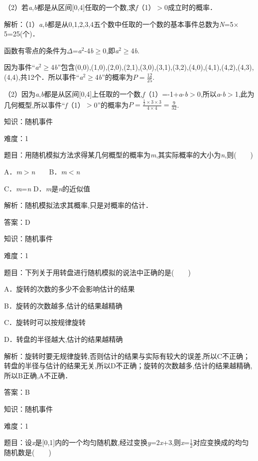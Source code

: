 \documentclass{article} %
\begin{document}
（2）若\textit{a},\textit{b}都是从区间[0,4]任取的一个数,求\textit{f}（1）$\mathrm{>}$0成立时的概率．

解析：（1）\textit{a},\textit{b}都是从0,1,2,3,4五个数中任取的一个数的基本事件总数为\textit{N}=5$\mathrm{\times}$5=25(个)．

函数有零点的条件为\textit{$\mathit{\Delta}$}=\textit{a}${}^{2}$-4\textit{b}$\mathrm{\ge}$0,即\textit{a}${}^{2}$$\mathrm{\ge}$4\textit{b}.

因为事件``\textit{a}${}^{2}$$\mathrm{\ge}$4\textit{b}''包含(0,0),(1,0),(2,0),(2,1),(3,0),(3,1),(3,2),(4,0),(4,1),(4,2),(4,3),(4,4),共12个．所以事件``\textit{a}${}^{2}$$\mathrm{\ge}$4\textit{b}''的概率为$P=\frac{12}{25}$.

（2）因为\textit{a},\textit{b}都是从区间[0,4]上任取的一个数,\textit{f}（1）=-1+\textit{a}-\textit{b}$\mathrm{>}$0,所以\textit{a}-\textit{b}$\mathrm{>}$1,此为几何概型,所以事件``\textit{f}（1）$\mathrm{>}$0''的概率为$P=\frac{\frac{1}{2}\times3\times3}{4\times4}=\frac{9}{32}$.

知识：随机事件

难度：1

题目：用随机模拟方法求得某几何概型的概率为\textit{m},其实际概率的大小为\textit{n},则(　　)

A．\textit{m}$\mathrm{>}$\textit{n}　　B．\textit{m}$\mathrm{<}$\textit{n}

C．\textit{m}=\textit{n}   D．\textit{m}是\textit{n}的近似值

解析：随机模拟法求其概率,只是对概率的估计．

答案：D

知识：随机事件

难度：1

题目：下列关于用转盘进行随机模拟的说法中正确的是(　　)

A．旋转的次数的多少不会影响估计的结果

B．旋转的次数越多,估计的结果越精确

C．旋转时可以按规律旋转

D．转盘的半径越大,估计的结果越精确

解析：旋转时要无规律旋转,否则估计的结果与实际有较大的误差,所以C不正确；转盘的半径与估计的结果无关,所以D不正确；旋转的次数越多,估计的结果越精确,所以B正确,A不正确．

答案：B

知识：随机事件

难度：1

题目：设\textit{x}是[0,1]内的一个均匀随机数,经过变换\textit{y}=2\textit{x}+3,则\textit{x}=$\frac{1}{2}$对应变换成的均匀随机数是(　　)
\end{document}
